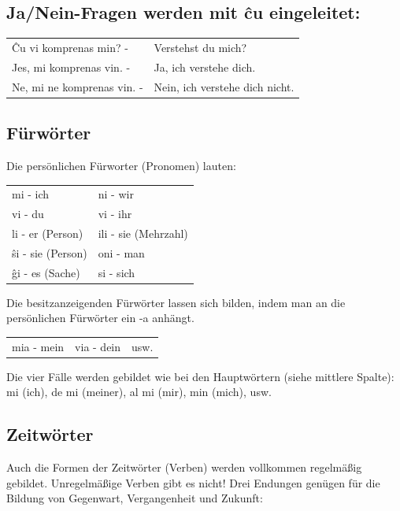 \documentclass{leaflet}
\begin{document}
\vspace{-.2cm}

\subsection{Ja/Nein-Fragen werden mit ĉu eingeleitet:}

\begin{tabular}{ll}
	Ĉu vi komprenas min? -& Verstehst du mich?\\
	Jes, mi komprenas vin. -& Ja, ich verstehe dich.\\
	Ne, mi ne komprenas vin. -& Nein, ich verstehe dich nicht.
\end{tabular}

\clearpage

\subsection{Fürwörter}

\vspace{-.2cm}

Die persönlichen Fürworter (Pronomen) lauten:

\begin{tabular}{ll}
mi - ich & ni - wir\\
vi - du  & vi - ihr\\
li - er (Person) & ili - sie (Mehrzahl)\\
ŝi - sie (Person) & oni - man\\
ĝi - es (Sache) & si - sich
\end{tabular}

Die besitzanzeigenden Fürwörter lassen sich bilden, indem man an die persönlichen Fürwörter ein -a anhängt.

\begin{tabular}{lll}
mia - mein & via - dein & usw.
\end{tabular}

Die vier Fälle werden gebildet wie bei den Hauptwörtern (siehe mittlere Spalte):
mi (ich), de mi (meiner), al mi (mir), min (mich), usw.

\vspace{-.3cm}

\subsection{Zeitwörter}
\hfill\hfill
\vspace{-.7cm}

Auch die Formen der Zeitwörter (Verben) werden vollkommen regelmäßig gebildet. Unregelmäßige Verben gibt es nicht! Drei Endungen genügen für die Bildung von Gegenwart, Vergangenheit und Zukunft:
\end{document}
